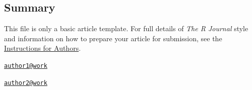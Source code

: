 \subsection{Summary}\label{summary}

This file is only a basic article template. For full details of
\emph{The R Journal} style and information on how to prepare your
article for submission, see the
\href{http://journal.r-project.org/latex/RJauthorguide.pdf}{Instructions
for Authors}.



\address{
Oliver Keyes\\
Wikimedia Foundation\\
line 1\\ line 2\\
}
\href{mailto:author1@work}{\nolinkurl{author1@work}}

\address{
Bob Rudis\\
Rapid7\\
line 1\\ line 2\\
}
\href{mailto:author2@work}{\nolinkurl{author2@work}}

